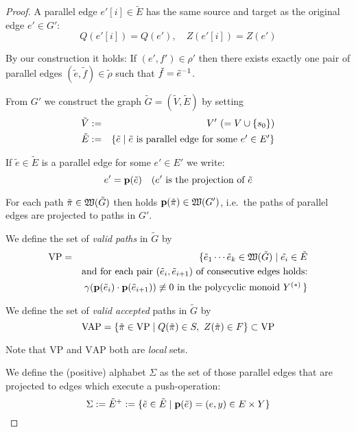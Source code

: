 \begin{proof}
A parallel edge $e'[i] \in \tilde E$ has the same source and target as
the original edge $e' \in G'$:
\[ Q(e'[i]) = Q(e'),\quad Z(e'[i]) = Z(e') \]

By our construction it holds:
If $(e', f') \in \rho'$ then there exists exactly one pair of parallel edges
$(\tilde e, \tilde f) \in \tilde\rho$ such that $\tilde f = \mbox{${\tilde e}^{-1}$}$.

From $G'$ we construct the graph $\tilde{G} = (\tilde{V}, \tilde{E})$ by setting
\begin{eqnarray*}
\tilde{V} &:=& V' \ (=V \cup \mbox{$\{s_0\}$}) \\
\tilde{E} &:=& \mbox{$\{\tilde e \mid \tilde e \text{ is parallel edge for
some }e' \in E'\}$}
\end{eqnarray*}

If $\tilde e \in \tilde{E}$ is a parallel edge for some $e' \in E'$ we write:
\[ e' = \mathbf{p}({\tilde e})\quad (e'\text{ is the projection of }\tilde e \] 

For each path $\tilde{\pi} \in \mbox{$\mathfrak{W}({\tilde{G}})$}$ then holds
$\mathbf{p}({\tilde{\pi}}) \in \mbox{$\mathfrak{W}({G'})$}$, i.e.\ the paths of parallel edges are
projected to paths in $G'$.

\newcommand{\validpaths}{\mathrm{VP}}
We define the set of {\em valid paths} in $\tilde{G}$ by
\begin{eqnarray*}
\validpaths &=& \{ \tilde e_1 \cdots \tilde e_k \in \pathcat{\tilde{G}}
\mid \tilde{e_i} \in \tilde{E} \\
& & \text{and for each pair }(\tilde e_i, \tilde e_{i+1})\text{ of consecutive
edges holds:}\\
& & \gamma(\proj{\tilde{e}_i} \cdot \proj{\tilde{e}_{i+1}}) \not\equiv 0\text{
in the polycyclic monoid }\pocymon{Y} \,\}
\end{eqnarray*}

\newcommand{\acceptedpaths}{\mathrm{VAP}}
We define the set of {\em valid accepted} paths in $\tilde{G}$ by
\begin{equation*}
\acceptedpaths = \setof{\tilde\pi \in \validpaths \mid Q(\tilde\pi) \in
S,\ Z(\tilde\pi) \in F} \subset \validpaths
\end{equation*}

Note that $\validpaths$ and $\acceptedpaths$ both are {\em local} sets.

\medskip
We define the (positive) alphabet $\Sigma$ as the set of those parallel edges
that are projected to edges which execute a push-operation:
\begin{equation*}
\Sigma := \tilde{E}^+ := \mbox{$\{\tilde e \in \tilde{E} \mid \mathbf{p}({\tilde e}) =
(e, y) \in E \times Y\}$}
\end{equation*}


\end{proof}
